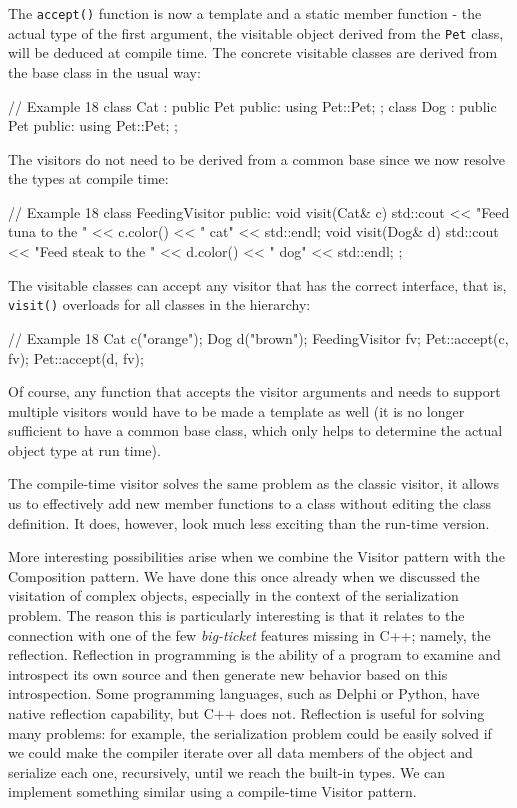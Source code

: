 The \texttt{accept()} function is now a template and a static member function - the actual type of the first argument, the visitable object derived from the \texttt{Pet} class, will be deduced at compile time. The concrete visitable classes are derived from the base class in the usual way:

\begin{code}
// Example 18
class Cat : public Pet {
  public:
  using Pet::Pet;
};
class Dog : public Pet {
  public:
  using Pet::Pet;
};
\end{code}

The visitors do not need to be derived from a common base since we now resolve the types at compile time:

\begin{code}
// Example 18
class FeedingVisitor {
  public:
  void visit(Cat& c) {
    std::cout << "Feed tuna to the " << c.color()
              << " cat" << std::endl;
  }
  void visit(Dog& d) {
    std::cout << "Feed steak to the " << d.color()
              << " dog" << std::endl;
  }
};
\end{code}

The visitable classes can accept any visitor that has the correct interface, that is, \texttt{visit()} overloads for all classes in the hierarchy:

\begin{code}
// Example 18
Cat c("orange");
Dog d("brown");
FeedingVisitor fv;
Pet::accept(c, fv);
Pet::accept(d, fv);
\end{code}

Of course, any function that accepts the visitor arguments and needs to support multiple visitors would have to be made a template as well (it is no longer sufficient to have a common base class, which only helps to determine the actual object type at run time).

The compile-time visitor solves the same problem as the classic visitor, it allows us to effectively add new member functions to a class without editing the class definition. It does, however, look much less exciting than the run-time version.

More interesting possibilities arise when we combine the Visitor pattern with the Composition pattern. We have done this once already when we discussed the visitation of complex objects, especially in the context of the serialization problem. The reason this is particularly interesting is that it relates to the connection with one of the few \emph{big-ticket} features missing in C++; namely, the reflection. Reflection in programming is the ability of a program to examine and introspect its own source and then generate new behavior based on this introspection. Some programming languages, such as Delphi or Python, have native reflection capability, but C++ does not. Reflection is useful for solving many problems: for example, the serialization problem could be easily solved if we could make the compiler iterate over all data members of the object and serialize each one, recursively, until we reach the built-in types. We can implement something similar using a compile-time Visitor pattern.

